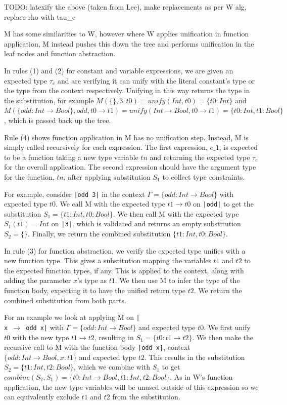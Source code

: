 \documentclass[a4paper,fleqn,oneside,12pt]{report}
\begin{document}
TODO: latexify the above (taken from Lee), make replacements as per W alg, replace rho with tau\_e

M has some similarities to W, however where W applies unification in function application, M instead pushes this down the tree and performs unification in the leaf nodes and function abstraction.

In rules (1) and (2) for constant and variable expressions, we are given an expected type $\tau_e$ and are verifying it can unify with the literal constant’s type or the type from the context respectively. Unifying in this way returns the type in the substitution, for example $M(\{\}, 3, t0) = unify(Int, t0) = \{ t0: Int \}$ and $M(\{ odd: Int \rightarrow Bool \}, odd, t0 \rightarrow t1) = unify(Int \rightarrow Bool, t0 \rightarrow t1) = \{ t0: Int, t1: Bool \}$, which is passed back up the tree.

Rule (4) shows function application in M has no unification step. Instead, M is simply called recursively for each expression. The first expression, $e\_1$, is expected to be a function taking a new type variable $tn$ and returning the expected type $\tau_e$ for the overall application. The second expression should have the argument type for the function, $tn$, after applying substitution $S_1$ to collect type constraints.

For example, consider \texttt{|odd 3|} in the context $\Gamma = \{ odd: Int \rightarrow Bool \}$ with expected type $t0$. We call M with the expected type $t1 \rightarrow t0$ on \texttt{|odd|} to get the substitution $S_1 = \{ t1: Int, t0: Bool \}$. We then call M with the expected type $S_1(t1) = Int$ on \texttt{|3|}, which is validated and returns an empty substitution $S_2 = \{\}$. Finally, we return the combined substitution $\{ t1: Int, t0: Bool \}$.

In rule (3) for function abstraction, we verify the expected type unifies with a new function type. This gives a substitution mapping the variables $t1$ and $t2$ to the expected function types, if any. This is applied to the context, along with adding the parameter $x$’s type as $t1$. We then use M to infer the type of the function body, expecting it to have the unified return type $t2$. We return the combined substitution from both parts.

For an example we look at applying M on \texttt{|\\x $\rightarrow$ odd x|} with $\Gamma = \{ odd: Int \rightarrow Bool \}$ and expected type $t0$. We first unify $t0$ with the new type $t1 \rightarrow t2$, resulting in $S_1 = \{ t0: t1 \rightarrow t2 \}$. We then make the recursive call to M with the function body \texttt{|odd x|}, context $\{ odd: Int \rightarrow Bool, x: t1 \}$ and expected type $t2$. This results in the substitution $S_2 = \{ t1: Int, t2: Bool \}$, which we combine with $S_1$ to get $combine(S_2, S_1) = \{ t0: Int \rightarrow Bool, t1: Int, t2: Bool \}$. As in W’s function application, the new type variables will be unused outside of this expression so we can equivalently exclude $t1$ and $t2$ from the substitution.
\end{document}
